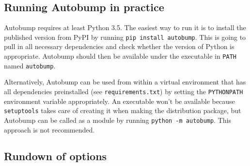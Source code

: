 \documentclass{l4proj}
\newcommand\genericstyle{\lstset{basicstyle=\ttm}}
\newcommand\codeinline[1]{{\genericstyle\lstinline!#1!}}
\begin{document}
\begin{appendices}

\chapter{Running Autobump in practice}
\label{AutobumpInPractice}

Autobump requires at least Python 3.5. The easiest way to run it is to
install the published version from PyPI by running \codeinline{pip
install autobump}. This is going to pull in all necessary dependencies
and check whether the version of Python is appropriate. Autobump
should then be available under the executable in \codeinline{PATH}
named \codeinline{autobump}.

Alternatively, Autobump can be used from within a virtual environment
that has all dependencies preinstalled (see
\codeinline{requirements.txt}) by setting the \codeinline{PYTHONPATH}
environment variable appropriately. An executable won't be available
because \codeinline{setuptools} takes care of creating it when making
the distribution package, but Autobump can be called as a module by
running \codeinline{python -m autobump}. This approach is not recommended.

\section{Rundown of options}
\label{RundownOptions}


\end{appendices}
\end{document}

